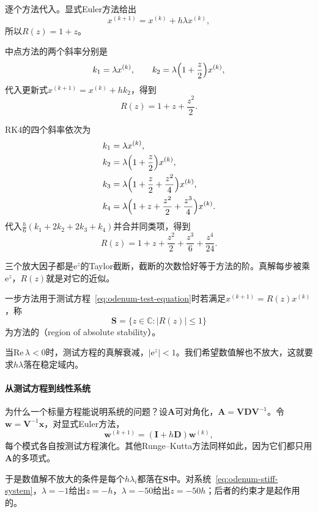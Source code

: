 逐个方法代入。显式Euler方法给出
\[
 x^{(k+1)}=x^{(k)}+h\lambda x^{(k)},
\]
所以$R(z)=1+z$。

中点方法的两个斜率分别是
\[
 k_1=\lambda x^{(k)},\qquad k_2=\lambda\Bigl(1+\frac{z}{2}\Bigr)x^{(k)},
\]
代入更新式$x^{(k+1)}=x^{(k)}+hk_2$，得到
\[
 R(z)=1+z+\frac{z^2}{2}.
\]

RK4的四个斜率依次为
\[
 \begin{aligned}
  k_1&=\lambda x^{(k)},\\
  k_2&=\lambda\Bigl(1+\frac{z}{2}\Bigr)x^{(k)},\\
  k_3&=\lambda\Bigl(1+\frac{z}{2}+\frac{z^2}{4}\Bigr)x^{(k)},\\
  k_4&=\lambda\Bigl(1+z+\frac{z^2}{2}+\frac{z^3}{4}\Bigr)x^{(k)}.
 \end{aligned}
\]
代入$\tfrac{h}{6}(k_1+2k_2+2k_3+k_4)$并合并同类项，得到
\[
 R(z)=1+z+\frac{z^2}{2}+\frac{z^3}{6}+\frac{z^4}{24}.
\]

三个放大因子都是$\mathrm{e}^{z}$的Taylor截断，截断的次数恰好等于方法的阶。真解每步被乘$\mathrm{e}^{z}$，$R(z)$就是对它的近似。

\begin{definition}[绝对稳定域]
 \label{def:odenum-stability-region}
 一步方法用于测试方程~\eqref{eq:odenum-test-equation}时若满足$x^{(k+1)}=R(z)x^{(k)}$，称
 \begin{equation}
  \bm{S}=\bigl\{z\in\mathbb{C}:\lvert R(z)\rvert\leq1\bigr\}
  \label{eq:odenum-stability-region}
 \end{equation}
 为方法的（region of absolute stability）。
\end{definition}

当$\mathrm{Re}\,\lambda<0$时，测试方程的真解衰减，$\lvert\mathrm{e}^{z}\rvert<1$。我们希望数值解也不放大，这就要求$h\lambda$落在稳定域内。

\paragraph{从测试方程到线性系统}
为什么一个标量方程能说明系统的问题？设$\bm{A}$可对角化，$\bm{A}=\bm{V}\bm{D}\bm{V}^{-1}$。令$\bm{w}=\bm{V}^{-1}\bm{x}$，对显式Euler方法，
\[
 \bm{w}^{(k+1)}=(\bm{I}+h\bm{D})\bm{w}^{(k)},
\]
每个模式各自按测试方程演化。其他Runge--Kutta方法同样如此，因为它们都只用$\bm{A}$的多项式。

于是数值解不放大的条件是每个$h\lambda_i$都落在$\bm{S}$中。对系统~\eqref{eq:odenum-stiff-system}，$\lambda=-1$给出$z=-h$，$\lambda=-50$给出$z=-50h$；后者的约束才是起作用的。

